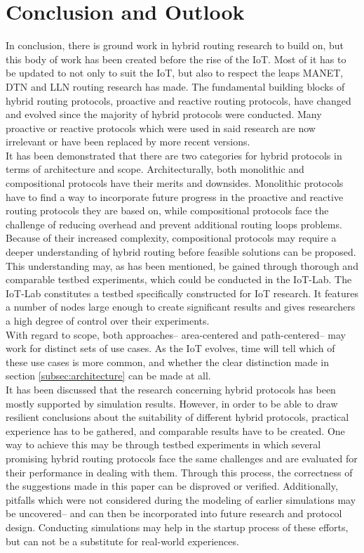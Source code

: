 \documentclass[a4paper,10pt]{scrartcl}
\begin{document}
\section{Conclusion and Outlook}
\label{sec:conclusion}
In conclusion, there is ground work in hybrid routing research to build on, but this body of work has been created  before the rise of the IoT. Most of it has to be updated to not only to suit the IoT, but also to respect the leaps MANET, DTN and LLN routing research has made. The fundamental building blocks of hybrid routing protocols, proactive and reactive routing protocols, have changed and evolved since the majority of hybrid protocols were conducted. Many proactive or reactive protocols which were used in said research are now irrelevant or have been replaced by more recent versions.\\

It has been demonstrated that there are two categories for hybrid protocols in terms of architecture and scope. 
Architecturally, both monolithic and compositional protocols have their merits and downsides. Monolithic protocols have to find a way to incorporate future progress in the proactive and reactive routing protocols they are based on, while compositional protocols face the challenge of reducing overhead and prevent additional routing loops problems. Because of their increased complexity, compositional protocols may require a deeper understanding of hybrid routing before feasible solutions can be proposed. This understanding may, as has been mentioned, be gained through thorough and comparable testbed experiments, which could be conducted in the IoT-Lab. The IoT-Lab constitutes a testbed specifically constructed for IoT research. It features a number of nodes large enough to create significant results and gives researchers a high degree of control over their experiments.\\
With regard to scope, both approaches-- area-centered and path-centered-- may work for distinct sets of use cases. As the IoT evolves, time will tell which of these use cases is more common, and whether the clear distinction made in section \ref{subsec:architecture} can be made at all.\\

It has been discussed that the research concerning hybrid protocols has been mostly supported by simulation results.
However, in order to be able to draw resilient conclusions about the suitability of different hybrid protocols, practical experience has to be gathered, and comparable results have to be created. One way to achieve this may be through testbed experiments in which several promising hybrid routing protocols face the same challenges and are evaluated for their performance in dealing with them. Through this process, the correctness of the suggestions made in this paper can be disproved or verified. Additionally, pitfalls which were not considered during the modeling of earlier simulations may be uncovered-- and can then be incorporated into future research and protocol design.
Conducting simulations may help in the startup process of these efforts, but can not be a substitute for real-world experiences.\\
\end{document}
